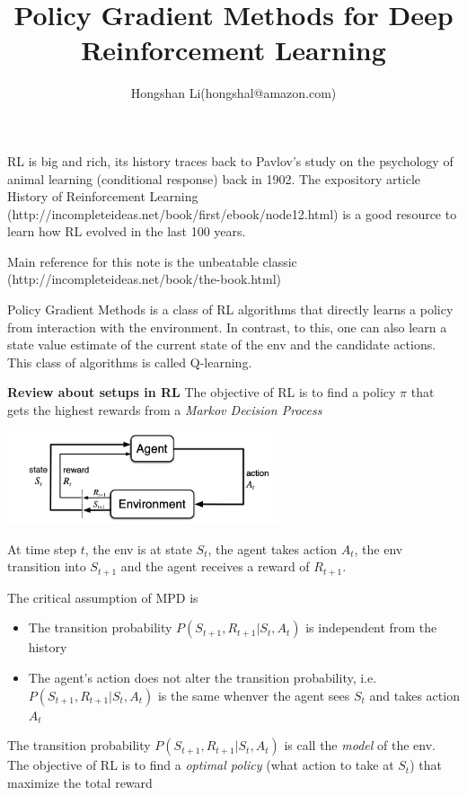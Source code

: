 \documentclass{article}
\title{Policy Gradient Methods for Deep Reinforcement Learning}
\author{Hongshan Li(hongshal@amazon.com)}
\begin{document}
\maketitle

RL is big and rich, its history traces back to Pavlov's study on the 
psychology of animal learning (conditional response) back in 1902.
The expository article History of Reinforcement Learning 
(http://incompleteideas.net/book/first/ebook/node12.html) 
is a good resource to learn
how RL evolved in the last 100 years.

Main reference for this note is the unbeatable classic 
(http://incompleteideas.net/book/the-book.html)

Policy Gradient Methods is a class of RL algorithms that directly 
learns a policy from interaction with the environment. In contrast,
to this, one can also learn a state value estimate of the current
state of the env and the candidate actions. This class of algorithms
is called Q-learning. 

\textbf{Review about setups in RL}
The objective of RL is to find a policy $\pi$ that gets the highest 
rewards from a \emph{Markov Decision Process}

\includegraphics[width=8cm]{mdp}

At time step $t$, the env is at state $S_t$, the agent takes action 
$A_t$, the env transition into $S_{t+1}$ and the agent receives a 
reward of $R_{t+1}$. 

The critical assumption of MPD is
\begin{itemize}
    \item The transition probability $P(S_{t+1}, R_{t+1}|S_t, A_t)$ is
        independent from the history
    \item The agent's action does not alter the transition probability,
        i.e. $P(S_{t+1}, R_{t+1} | S_t, A_t)$ is the same whenver 
        the agent sees $S_t$ and takes action $A_t$
\end{itemize}

The transition probability $P(S_{t+1}, R_{t+1} | S_t, A_t)$ is call 
the \emph{model} of the env. The objective of RL is to find a
\emph{optimal policy}
(what action to take at $S_t$) that maximize the total reward
\end{document}
